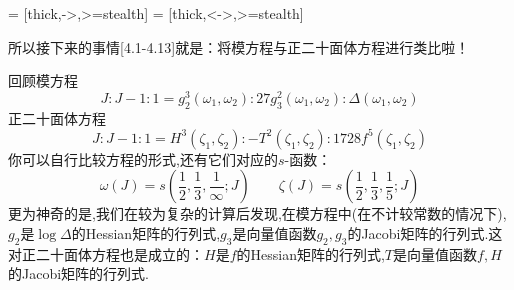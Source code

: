 \documentclass[12pt,A4paper,oneside]{amsart}
\numberwithin{equation}{section}
\theoremstyle{plain}
\theoremstyle{plain}
\theoremstyle{plain}
\numberwithin{equation}{section}
\theoremstyle{remark}
\begin{document}
 = [thick,->,>=stealth]
 = [thick,<->,>=stealth]
\begin{center}
\end{center}
所以接下来的事情[4.1-4.13]就是：将模方程与正二十面体方程进行类比啦！

回顾模方程
$$J:J-1:1=g_2^3(\omega_1,\omega_2):27g_3^2(\omega_1,\omega_2):\Delta(\omega_1,\omega_2)$$
正二十面体方程
$$J:J-1:1=H^3(\zeta_1,\zeta_2):-T^2(\zeta_1,\zeta_2):1728f^5(\zeta_1,\zeta_2)$$
你可以自行比较方程的形式,还有它们对应的$s$-函数：
$$\omega(J)=s\left(\frac{1}{2},\frac{1}{3},\frac{1}{\infty};J\right)\qquad\zeta(J)=s\left(\frac{1}{2},\frac{1}{3},\frac{1}{5};J\right)$$
更为神奇的是,我们在较为复杂的计算后发现,在模方程中(在不计较常数的情况下),$g_2$是$\log \Delta$的Hessian矩阵的行列式,$g_3$是向量值函数$g_2,g_3$的Jacobi矩阵的行列式.这对正二十面体方程也是成立的：$H$是$f$的Hessian矩阵的行列式,$T$是向量值函数$f,H$的Jacobi矩阵的行列式.
\end{document}
